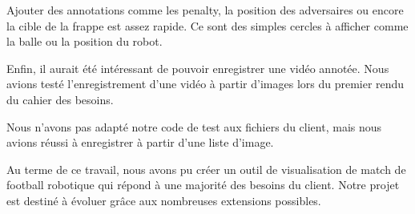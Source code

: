 Ajouter des annotations comme les penalty, la position des 
adversaires ou encore la cible de la frappe est assez rapide.
Ce sont des simples cercles à afficher comme la balle ou la 
position du robot.
\bigskip

Enfin, il aurait été intéressant de pouvoir enregistrer une vidéo 
annotée. Nous avions testé l'enregistrement d'une vidéo à partir 
d'images lors du premier rendu du cahier des besoins. 

Nous n'avons pas adapté notre code de test aux fichiers du client,
mais nous avions réussi à enregistrer à partir d'une liste
d'image.
\bigskip

Au terme de ce travail, nous avons pu créer un outil de
visualisation de match de football robotique qui répond à une
majorité des besoins du client. Notre projet est destiné à évoluer
grâce aux nombreuses extensions possibles.
